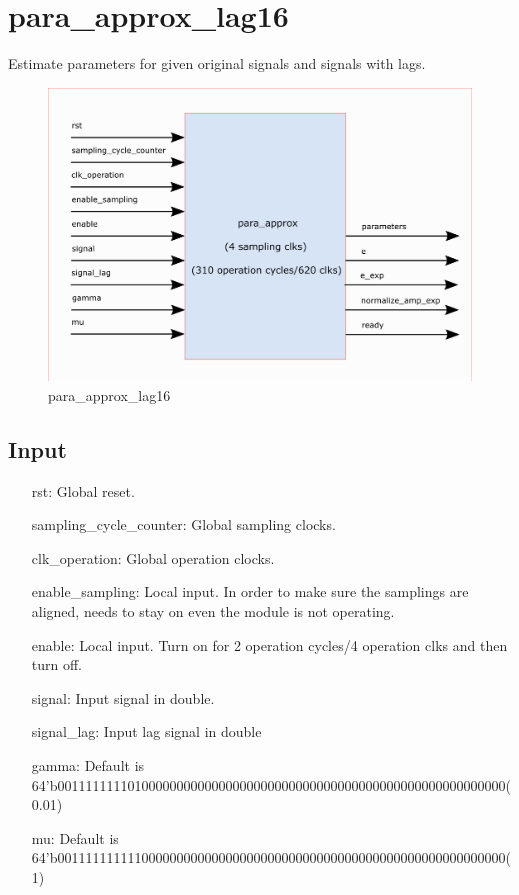 \documentclass[twoside,a4paper]{refart}
\begin{document}
\section{para\_approx\_lag16}
Estimate parameters for given original signals and signals with lags.
\begin{figure}[H]
	\centering
	\includegraphics[scale=1.2]{para_approx.png}
	\caption{para\_approx\_lag16}
	\label{}
\end{figure}
\subsection{Input}
\begin{itemize}
		\item[rst:      ] Global reset.
		\item[sampling\_cycle\_counter:] Global sampling clocks.
		\item[clk\_operation:] Global operation clocks.
		\item[enable\_sampling:] Local input. In order to make sure the samplings are aligned, needs to stay on even the module is not operating.
		\item[enable:] Local input. Turn on for 2 operation cycles/4 operation clks and then turn off.
		\item[signal:] Input signal in double.
		\item[signal\_lag:] Input lag signal in double
		\item[gamma:] Default is\\ 64'b0011111111010000000000000000000000000000000000000000000000000000(0.01)
		\item[mu:   ] Default is\\ 64'b0011111111110000000000000000000000000000000000000000000000000000(1)
		
\end{itemize}
\end{document}
